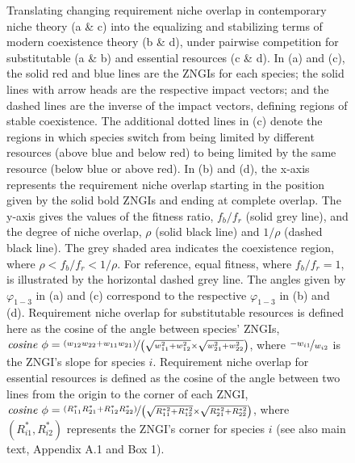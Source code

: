 \begin{figure}[h!]
	{\hspace{1mm}Translating changing requirement niche overlap in contemporary niche theory (a \& c) into the equalizing and stabilizing terms of modern coexistence theory (b \& d), under pairwise competition for substitutable (a \& b) and essential resources (c \& d). In (a) and (c), the solid red and blue lines are the ZNGIs for each species; the solid lines with arrow heads are the respective impact vectors; and the dashed lines are the inverse of the impact vectors, defining regions of stable coexistence. The additional dotted lines in (c) denote the regions in which species switch from being limited by different resources (above blue and below red) to being limited by the same resource (below blue or above red). In (b) and (d), the x-axis represents the requirement niche overlap starting in the position given by the solid bold ZNGIs and ending at complete overlap. The y-axis gives the values of the fitness ratio, $f_{b}/f_{r}$ (solid grey line), and the degree of niche overlap, $\rho$ (solid black line) and $1/\rho$ (dashed black line). The grey shaded area indicates the coexistence region, where $\rho<f_{b}/f_{r}<1/\rho$. For reference, equal fitness, where $f_{b}/f_{r}=1$, is illustrated by the horizontal dashed grey line. The angles given by $\varphi_{1-3}$ in (a) and (c) correspond to the respective $\varphi_{1-3}$ in (b) and (d). Requirement niche overlap for substitutable resources is defined here as the cosine of the angle between species' ZNGIs, $\mathit{cosine}\ \phi  = \nicefrac{\left( w_{12}w_{22}+w_{11}w_{21} \right)}{\left( \sqrt{w_{11}^{2}+w_{12}^{2}} \times \sqrt{w_{21}^{2}+w_{22}^{2}} \right)}$, where $\nicefrac{-w_{i1}}{w_{i2}}$ is the ZNGI's slope for species $\mathit{i}$. Requirement niche overlap for essential resources is defined as the cosine of the angle between two lines from the origin to the corner of each ZNGI, $\mathit{cosine}\ \phi  = \nicefrac{\left( R_{11}^{*}R_{21}^{*}+R_{12}^{*}R_{22}^{*} \right)}{\left( \sqrt{R_{11}^{*2}+R_{12}^{*2}}\times \sqrt{R_{21}^{*2}+R_{22}^{*2}} \right)}$, where $\left (R_{i1}^{*}, R_{i2}^{*}\right )$ represents the ZNGI's corner for species $\mathit{i}$ (see also main text, Appendix A.1 and Box 1).}
\label{fig:require-ms-fig-fixedequilibrium}
\end{figure}



